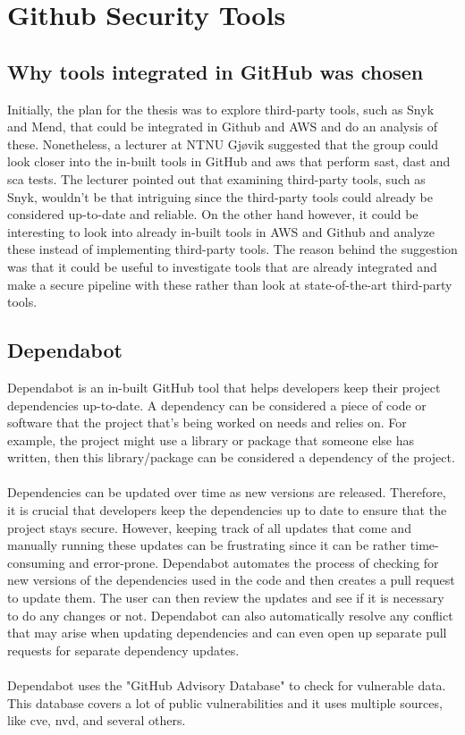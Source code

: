 \section{Github Security Tools}
\subsection{Why tools integrated in GitHub was chosen}
Initially, the plan for the thesis  was to explore third-party tools, such as Snyk and Mend,  that could be integrated in Github and AWS and do an analysis of these. Nonetheless, a lecturer at NTNU Gjøvik suggested that the group could look closer into the in-built tools in GitHub and aws that perform \acrshort{sast}, \acrshort{dast} and \acrshort{sca} tests. The lecturer pointed out that examining third-party tools, such as Snyk, wouldn't be that intriguing since the third-party tools could already be considered up-to-date and reliable. On the other hand however, it could be interesting  to look into already in-built tools in AWS and Github and analyze these instead of implementing third-party tools. The reason behind the suggestion was that it could be useful to investigate tools that are already integrated and make a secure pipeline with these rather than look at state-of-the-art third-party tools. 

\subsection{Dependabot}
Dependabot is an in-built GitHub tool that helps developers keep their project dependencies up-to-date. A dependency can be considered a piece of code or software that the project that's being worked on needs and relies on. For example, the project might use a library or package that someone else has written, then this library/package can be considered a dependency of the project. 
\\~\\
Dependencies can be updated over time as new versions are released. Therefore, it is crucial that developers keep the dependencies up to date to ensure that the project stays secure. However, keeping track of all updates that come and manually running these updates can be frustrating since it can be rather time-consuming and error-prone. Dependabot automates the process of checking for new versions of the dependencies used in the code and then creates a pull request to update them. The user can then review the updates and see if it is necessary to do any changes or not. 
Dependabot can also automatically resolve any conflict that may arise when updating dependencies and can even open up separate pull requests for separate dependency updates.  \cite{GithubDependabot2}
\\~\\
Dependabot uses the "GitHub Advisory Database" to check for vulnerable data. This database covers a lot of public vulnerabilities and it uses multiple sources, like \acrlong{cve}, \acrlong{nvd}, and several others. \cite{GithubDependabot1}

